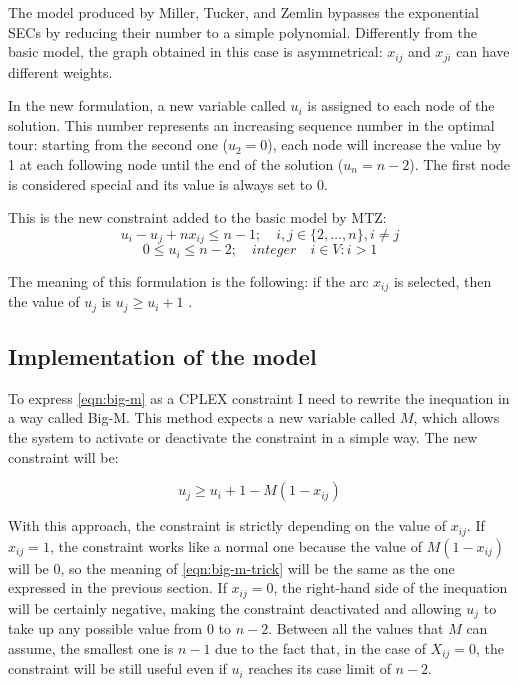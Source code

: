The model produced by Miller, Tucker, and Zemlin bypasses the exponential SECs by reducing their number to a simple polynomial.  Differently from the basic model, the graph obtained in this case is asymmetrical: $x_{ij}$ and $x_{ji}$ can have different weights.

In the new formulation, a new variable called $u_i$ is assigned to each node of the solution. This number represents an increasing sequence number in the optimal tour: starting from the second one ($u_2=0$), each node will increase the value by 1 at each following node until the end of the solution ($u_n=n-2$). The first node is considered special and its value is always set to $0$.

This is the new constraint added to the basic model by MTZ:
	\begin{equation}
	\label{eqn:big-m}
	u_i-u_j+nx_{ij}\le n-1; \quad i,j\in \{2, \dots, n\}, i \not=j
	\end{equation}
	\begin{equation}
	\label{eqn:u-bound}
	0 \le u_i \le n-2; \quad integer \quad i \in V:i>1
	\end{equation}


The meaning of this formulation is the following: if the arc $x_{ij}$ is selected, then the value of $u_j$ is $u_j \ge u_i+1$ .

\subsection{Implementation of the model}
To express \ref{eqn:big-m} as a CPLEX constraint I need to rewrite the inequation in a way called Big-M. This method expects a new variable called $M$, which allows the system to activate or deactivate the constraint in a simple way. The new constraint will be:

\begin{equation}
\label{eqn:big-m-trick}
u_j\ge u_i+1-M(1-x_{ij})
\end{equation}

With this approach, the constraint is strictly depending on the value of $x_{ij}$. If $x_{ij}=1$, the constraint works like a normal one because the value of $M(1-x_{ij})$ will be $0$, so the meaning of \ref{eqn:big-m-trick} will be the same as the one expressed in the previous section. 
If $x_{ij}=0$, the right-hand side of the inequation will be certainly negative, making the constraint deactivated and allowing $u_j$ to take up any possible value from $0$ to $n-2$. Between all the values that $M$ can assume, the smallest one is $n-1$ due to the fact that, in the case of $X_{ij}=0$, the constraint will be still useful even if $u_i$ reaches its case limit of $n-2$.

